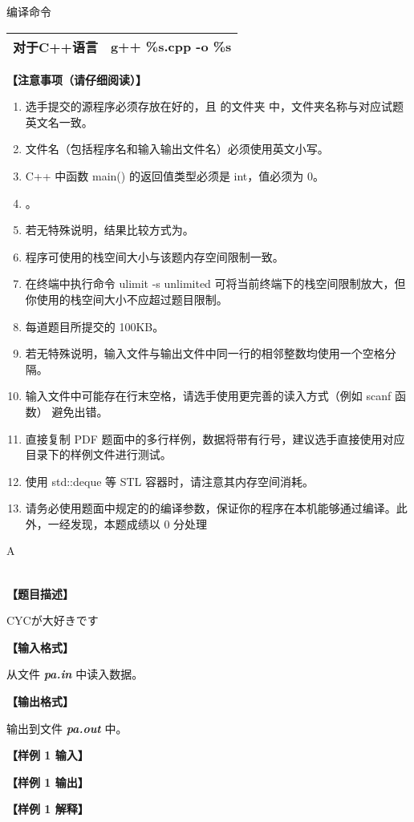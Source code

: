 \documentclass{article}
\theoremstyle{mytheoremstyle}
\theoremstyle{mytheoremstyle}
\theoremstyle{myproblemstyle}
\begin{document}
  编译命令

  \begin{table}[htbp]
    \label{tab:lang}
    \begin{center}
        \begin{tabular}{|p{2.5cm}|p{11.3 cm}|}
          \hline
          对于C++语言 & g++ \%s.cpp -o \%s\\ \hline

      \end{tabular}
    \end{center}
  \end{table}

  \textbf{【注意事项（请仔细阅读）】}

  \begin{enumerate}
    \item 选手提交的源程序必须存放在好的，且 的文件夹 中，文件夹名称与对应试题英文名一致。
    \item 文件名（包括程序名和输入输出文件名）必须使用英文小写。
    \item C++ 中函数 main() 的返回值类型必须是 int，值必须为 0。
    \item {}。
    \item 若无特殊说明，结果比较方式为。
    \item 程序可使用的栈空间大小与该题内存空间限制一致。
    \item 在终端中执行命令 ulimit -s unlimited 可将当前终端下的栈空间限制放大，但你使用的栈空间大小不应超过题目限制。
    \item 每道题目所提交的 100KB。
    \item 若无特殊说明，输入文件与输出文件中同一行的相邻整数均使用一个空格分隔。
    \item 输入文件中可能存在行末空格，请选手使用更完善的读入方式（例如 scanf 函数） 避免出错。
    \item 直接复制 PDF 题面中的多行样例，数据将带有行号，建议选手直接使用对应目录下的样例文件进行测试。
    \item 使用 std::deque 等 STL 容器时，请注意其内存空间消耗。
    \item 请务必使用题面中规定的的编译参数，保证你的程序在本机能够通过编译。此外，一经发现，本题成绩以 0 分处理
  \end{enumerate}

  \clearpage

  \begin{center}
    \huge{A}
  \end{center}
  ~\\[10pt]

  \textbf{【题目描述】}

  CYCが大好きです

  \textbf{【输入格式】}

  从文件 \textbf{\textit{pa.in}} 中读入数据。

  \textbf{【输出格式】}

  输出到文件 \textbf{\textit{pa.out}} 中。

  \textbf{【样例 1 输入】}

  \textbf{【样例 1 输出】}

  \textbf{【样例 1 解释】}
  
\end{document}
